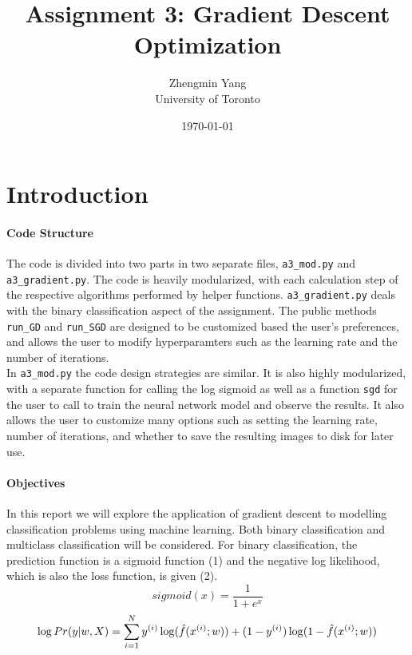 \documentclass[11pt,letterpaper,titlepage]{article}
\title{Assignment 3: Gradient Descent Optimization}
\author{Zhengmin Yang \\ University of Toronto}
\date{\today}
\begin{document}
	\maketitle
	
	\section{Introduction}
	\paragraph{Code Structure}
	The code is divided into two parts in two separate files, \texttt{a3\_mod.py} and\\ \texttt{a3\_gradient.py}. The code is heavily modularized, with each calculation step of the respective algorithms performed by helper functions. \texttt{a3\_gradient.py} deals with the binary classification aspect of the assignment. The public methods \texttt{run\_GD} and \texttt{run\_SGD} are designed to be customized based the user's preferences, and allows the user to modify hyperparamters such as the learning rate and the number of iterations.\\
	In \texttt{a3\_mod.py} the code design strategies are similar. It is also highly modularized, with a separate function for calling the log sigmoid as well as a function \texttt{sgd} for the user to call to train the neural network model and observe the results. It also allows the user to customize many options such as setting the learning rate, number of iterations, and whether to save the resulting images to disk for later use.
	
	\paragraph{Objectives}
	In this report we will explore the application of gradient descent to modelling classification problems using machine learning. Both binary classification and multiclass classification will be considered. For binary classification, the prediction function is a sigmoid function (1) and the negative log likelihood, which is also the loss function, is given (2).
	\begin{equation}
	sigmoid(x)=\frac{1}{1+e^{x}}
	\end{equation}
	\begin{equation}
	\log Pr(\boldmath y \unboldmath | \boldmath w \unboldmath, \boldmath X \unboldmath)  = \sum_{i=1}^{N} y^{(i)}\log(\hat{f}(\boldmath x^{(i)}\unboldmath; \boldmath w \unboldmath)) + (1-y^{(i)})\log (1-\hat{f}(\boldmath x^{(i)} \unboldmath; \boldmath w \unboldmath))
	\end{equation}
	
\end{document}
